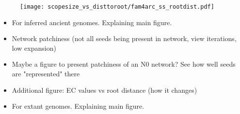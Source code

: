 \begin{figure}[H]
    \centering
    \texttt{[image: scopesize\_vs\_disttoroot/fam4arc\_ss\_rootdist.pdf]}
    \caption{}
    \label{fam_scopesize}
\end{figure}   



\begin{itemize}
    \item For inferred ancient genomes. Explaining main figure.
        \item Network patchiness (not all seeds being present in network, view iterations, low expansion)
        \item Maybe a figure to present patchiness of an N0 network? See how well seeds are "represented" there 
    \item Additional figure: EC values vs root distance (how it changes)
    \item For extant genomes. Explaining main figure.
\end{itemize}